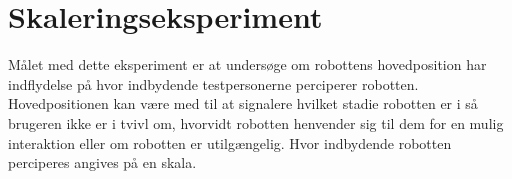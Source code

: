 \chapter{Skaleringseksperiment}
\label{Skaleringseksperiment}
%
Målet med dette eksperiment er at undersøge om robottens hovedposition har indflydelse på hvor indbydende testpersonerne perciperer robotten. Hovedpositionen kan være med til at signalere hvilket stadie robotten er i så brugeren ikke er i tvivl om, hvorvidt robotten henvender sig til dem for en mulig interaktion eller om robotten er utilgængelig. Hvor indbydende robotten perciperes angives på en skala.      
%